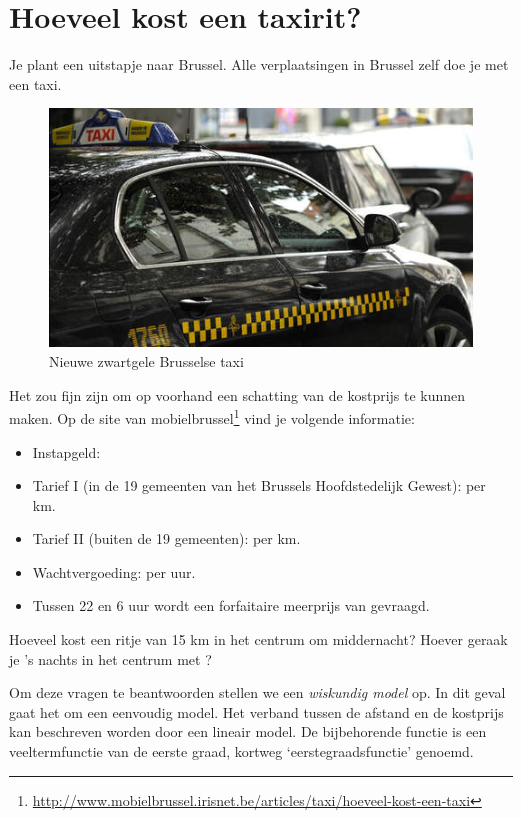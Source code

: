 \section{Hoeveel kost een taxirit?}\label{sec:taxirit}
Je plant een uitstapje naar Brussel. Alle verplaatsingen in Brussel zelf doe je met een taxi. 
 \begin{figure}[htbp]
      \centering
     \includegraphics[width=\textwidth]{figuren/eerstegraadsfuncties/taxi.jpg}
     \caption{Nieuwe zwartgele Brusselse taxi}
     \label{fig:taxi}
 \end{figure}
Het zou fijn zijn om op voorhand een schatting van de kostprijs te kunnen maken. Op de site van mobielbrussel\footnote{\url{http://www.mobielbrussel.irisnet.be/articles/taxi/hoeveel-kost-een-taxi}} vind je volgende informatie:
\begin{itemize}
\item Instapgeld: 
\item Tarief I (in de 19 gemeenten van het Brussels Hoofdstedelijk Gewest): 	 per km.
\item Tarief II (buiten de 19 gemeenten):  per km.
\item Wachtvergoeding:  per uur.
\item Tussen 22 en 6 uur wordt een forfaitaire meerprijs van  gevraagd.
\end{itemize}
Hoeveel kost een ritje van 15 km in het centrum om middernacht?  Hoever geraak je 's nachts in het centrum met ? 

Om deze vragen te beantwoorden stellen we een \emph{wiskundig model} op. In dit geval gaat het om een eenvoudig model. Het verband tussen de afstand en de kostprijs kan beschreven worden door een lineair model. De bijbehorende functie is een veeltermfunctie van de eerste graad, kortweg `eerstegraadsfunctie' genoemd.

